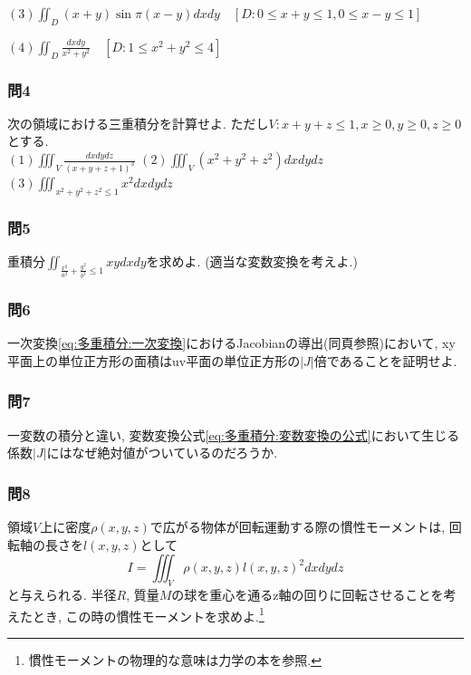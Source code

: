 \documentclass[a4j,dvipdfmx]{jsarticle}
\numberwithin{equation}{section}
\begin{document}
                \noindent
                $(3)\displaystyle \iint_D(x+y)\sin\pi(x-y)dxdy\quad [D:0\leq x+y\leq 1,0\leq x-y\leq 1]$

                \noindent
                $(4)\displaystyle\iint_D \frac{dxdy}{x^2+y^2} \quad [D:1\leq x^2+y^2\leq 4]$
            
            \subsubsection*{問4} 次の領域における三重積分を計算せよ. ただし$V:x+y+z\leq 1,x\geq 0, y\geq 0,z\geq 0$とする.\\
                $(1)\displaystyle \iiint_V \frac{dxdydz}{(x+y+z+1)^3}$\hspace{5mm}
                $(2)\displaystyle \iiint_V (x^2+y^2+z^2)dxdydz$\hspace{5mm}
                $(3)\displaystyle \iiint_{x^2+y^2+z^2\leq 1}x^2dxdydz$
    
            \subsubsection*{問5}重積分$\displaystyle\iint_{\frac{x^2}{a^2}+\frac{y^2}{b^2}\leq 1}xydxdy $を求めよ. (適当な変数変換を考えよ.)
            \vspace{-0.5cm}

            \subsubsection*{問6}一次変換\eqref{eq:多重積分:一次変換}におけるJacobianの導出(同頁参照)において, xy平面上の単位正方形の面積はuv平面の単位正方形の$|J|$倍であることを証明せよ.
            \vspace{-0.5cm} 

            \subsubsection*{問7}一変数の積分と違い, 変数変換公式\eqref{eq:多重積分:変数変換の公式}において生じる係数$|J|$にはなぜ絶対値がついているのだろうか.
            \vspace{-1cm} 

            \subsubsection*{問8}領域$V$上に密度$\rho(x,y,z)$で広がる物体が回転運動する際の慣性モーメントは, 回転軸の長さを$l(x,y,z)$として
                \begin{equation}
                    I=\iiint_{V}\rho(x,y,z)l(x,y,z)^2dxdydz
                \end{equation}
                と与えられる. 半径$R$, 質量$M$の球を重心を通るz軸の回りに回転させることを考えたとき, この時の慣性モーメントを求めよ.\footnote{慣性モーメントの物理的な意味は力学の本を参照.}
            \clearpage
\end{document}
